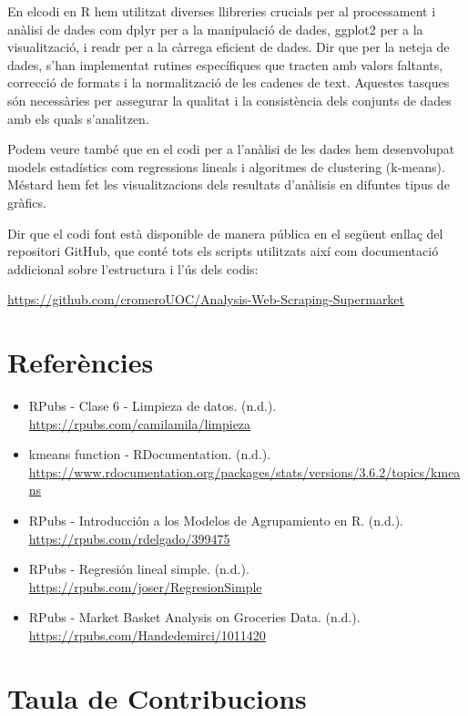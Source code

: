 \documentclass[
]{article}
\begin{document}
En elcodi en R hem utilitzat diverses llibreries crucials per al
processament i anàlisi de dades com dplyr per a la manipulació de dades,
ggplot2 per a la visualització, i readr per a la càrrega eficient de
dades. Dir que per la neteja de dades, s'han implementat rutines
específiques que tracten amb valors faltants, correcció de formats i la
normalització de les cadenes de text. Aquestes tasques són necessàries
per assegurar la qualitat i la consistència dels conjunts de dades amb
els quals s'analitzen.

Podem veure també que en el codi per a l'anàlisi de les dades hem
desenvolupat models estadístics com regressions lineals i algoritmes de
clustering (k-means). Méstard hem fet les visualitzacions dels resultats
d'anàlisis en difuntes tipus de gràfics.

Dir que el codi font està disponible de manera pública en el següent
enllaç del repositori GitHub, que conté tots els scripts utilitzats així
com documentació addicional sobre l'estructura i l'ús dels codis:

\url{https://github.com/cromeroUOC/Analysis-Web-Scraping-Supermarket}

\hypertarget{referuxe8ncies}{%
\section{Referències}\label{referuxe8ncies}}

\begin{itemize}
\item
  RPubs - Clase 6 - Limpieza de datos. (n.d.).
  \url{https://rpubs.com/camilamila/limpieza}
\item
  kmeans function - RDocumentation. (n.d.).
  \url{https://www.rdocumentation.org/packages/stats/versions/3.6.2/topics/kmeans}
\item
  RPubs - Introducción a los Modelos de Agrupamiento en R. (n.d.).
  \url{https://rpubs.com/rdelgado/399475}
\item
  RPubs - Regresión lineal simple. (n.d.).
  \url{https://rpubs.com/joser/RegresionSimple}
\item
  RPubs - Market Basket Analysis on Groceries Data. (n.d.).
  \url{https://rpubs.com/Handedemirci/1011420}
\end{itemize}

\hypertarget{taula-de-contribucions}{%
\section{Taula de Contribucions}\label{taula-de-contribucions}}
\end{document}
